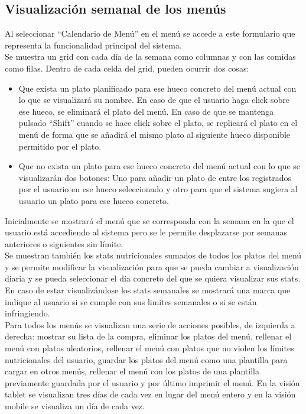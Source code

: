 \documentclass[12pt, a4paper, twoside]{book}
\begin{document}
	\subsection{Visualización semanal de los menús}
	Al seleccionar ``Calendario de Menú'' en el menú se accede a este formulario que representa la funcionalidad principal del sistema.\\
	Se muestra un grid con cada día de la semana como columnas y con las comidas como filas. Dentro de cada celda del grid, pueden ocurrir dos cosas:
	\begin{itemize}
		\item Que exista un plato planificado para ese hueco concreto del menú actual con lo que se visualizará su nombre. En caso de que el usuario haga click sobre ese hueco, se eliminará el plato del menú. En caso de que se mantenga pulsado ``Shift'' cuando se hace click sobre el plato, se replicará el plato en el menú de forma que se añadirá el mismo plato al siguiente hueco disponible permitido por el plato.
		\item Que no exista un plato para ese hueco concreto del menú actual con lo que se visualizarán dos botones: Uno para añadir un plato de entre los registrados por el usuario en ese hueco seleccionado y otro para  que el sistema sugiera al usuario un plato para ese hueco concreto.
	\end{itemize}
	Inicialmente se mostrará el menú que se corresponda con la semana en la que el usuario está accediendo al sistema pero se le permite desplazarse por semanas anteriores o siguientes sin límite.\\
	Se muestran también los stats nutricionales sumados de todos los platos del menú y se permite modificar la visualización para que se pueda cambiar a visualización diaria y se pueda seleccionar el día concreto del que se quiera visualizar sus stats. En caso de estar visualizándose los stats semanales se mostrará una marca que indique al usuario si se cumple con sus limites semanales o si se están infringiendo.\\
	Para todos los menús se visualizan una serie de acciones posibles, de izquierda a derecha: mostrar su lista de la compra, eliminar los platos del menú, rellenar el menú con platos aleatorios, rellenar el menú con platos que no violen los límites nutricionales del usuario, guardar los platos del menú como una plantilla para cargar en otros menús, rellenar el menú con los platos de una plantilla previamente guardada por el usuario y por último imprimir el menú.
	En la visión tablet se visualizan tres días de cada vez en lugar del menú entero y en la visión mobile se visualiza un día de cada vez.\\
\end{document}
